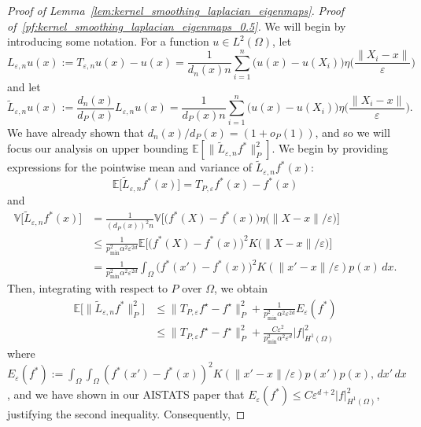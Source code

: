 \documentclass{article}
\newcommand{\1}{\mathbf{1}}
\newcommand{\Ebb}{\mathbb{E}}
\newcommand{\dx}{\,dx}
\newcommand{\wt}[1]{\widetilde{#1}}
\theoremstyle{definition}
\theoremstyle{remark}
\begin{document}
\begin{proof}[Proof of Lemma~\ref{lem:kernel_smoothing_laplacian_eigenmaps}]
	\textit{Proof of~\eqref{pf:kernel_smoothing_laplacian_eigenmaps_0.5}.}  
	We will begin by introducing some notation. For a function $u \in L^2(\Omega)$, let
	\begin{equation*}
	L_{\varepsilon,n}u(x) := T_{\varepsilon,n}u(x) - u(x) = \frac{1}{d_n(x)n} \sum_{i = 1}^{n} \bigl(u(x) - u(X_i)\bigr) \eta\biggl(\frac{\|X_i - x\|}{\varepsilon}\biggr)
	\end{equation*}
	and let
	\begin{equation*}
	\wt{L}_{\varepsilon,n}u(x) := \frac{d_n(x)}{d_P(x)}L_{\varepsilon,n}u(x) = \frac{1}{d_P(x)n} \sum_{i = 1}^{n} \bigl(u(x) - u(X_i)\bigr) \eta\biggl(\frac{\|X_i - x\|}{\varepsilon}\biggr).
	\end{equation*}
	We have already shown that $d_n(x)/d_P(x) = (1 + o_P(1))$, and so we will focus our analysis on upper bounding $\Ebb[\|\wt{L}_{\varepsilon,n}f^{\ast}\|_P^2]$. We begin by providing expressions for the pointwise mean and variance of $\wt{L}_{\varepsilon,n}f^{\ast}(x)$:
	\begin{equation*}
	\Ebb\bigl[\wt{L}_{\varepsilon,n}f^{\ast}(x)\bigr] = T_{P,\varepsilon}f^{\ast}(x) - f^{\ast}(x)
	\end{equation*}
	and
	\begin{align*}
	\mathbb{V}\bigl[\wt{L}_{\varepsilon,n}f^{\ast}(x)\bigr] & = \frac{1}{(d_P(x))^2 n} \mathbb{V}\bigl[\bigl(f^{\ast}(X) - f^{\ast}(x)\bigr) \eta\bigl(\|X - x\|/\varepsilon\bigr)\bigr] \\
	& \leq \frac{1}{p_{\min}^2 \alpha^2 \varepsilon^{2d}} \mathbb{E}\bigl[\bigl(f^{\ast}(X) - f^{\ast}(x)\bigr)^2 K\bigl(\|X - x\|/\varepsilon\bigr)\bigr] \\
	& = \frac{1}{p_{\min}^2 \alpha^2 \varepsilon^{2d}} \int_{\Omega} \bigl(f^{\ast}(x') - f^{\ast}(x)\bigr)^2 K(\|x' - x\|/\varepsilon) p(x) \,dx.
	\end{align*}
	Then, integrating with respect to $P$ over $\Omega$, we obtain
	\begin{align*}
	\Ebb\bigl[\|\wt{L}_{\varepsilon,n}f^{\ast}\|_P^2\bigr]  & \leq \|T_{P,\varepsilon}f^{\star} - f^{\star}\|_{P}^2 + \frac{1}{p_{\min}^2 \alpha^2 \varepsilon^{2d}} E_{\varepsilon}(f^{\ast}) \\
	& \leq \|T_{P,\varepsilon}f^{\star} - f^{\star}\|_{P}^2 + \frac{C\varepsilon^2}{p_{\min}^2 \alpha^2 \varepsilon^{d}} |f|_{H^1(\Omega)}^2
	\end{align*}
	where $E_{\varepsilon}(f^{\ast}) := \int_{\Omega} \int_{\Omega} (f^{\ast}(x') - f^{\ast}(x))^2 K(\|x' - x\|/\varepsilon) p(x') p(x) ,\dx' \,dx$, and we have shown in our AISTATS paper that $E_{\varepsilon}(f^{\ast}) \leq C \varepsilon^{d + 2} |f|_{H^1(\Omega)}^2$, justifying the second inequality. Consequently, 

\end{proof}
\end{document}
